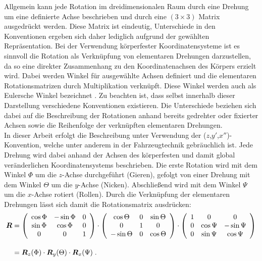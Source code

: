 Allgemein kann jede Rotation im dreidimensionalen Raum durch eine Drehung um eine definierte Achse beschrieben und durch eine $(3 \times 3)$ Matrix ausgedrückt werden. Diese Matrix ist eindeutig, Unterschiede in den Konventionen ergeben sich daher lediglich aufgrund der gewählten Repräsentation. Bei der Verwendung körperfester Koordinatensysteme ist es sinnvoll die Rotation als Verknüpfung von elementaren Drehungen darzustellen, da so eine direkter Zusammenhang zu den Koordinatenachsen des Körpers erzielt wird. Dabei werden Winkel für ausgewählte Achsen definiert und die elementaren Rotationsmatrizen durch Multiplikation verknüpft. Diese Winkel werden auch als Eulersche Winkel bezeichnet \cite{Foley1990}. Zu beachten ist, dass selbst innerhalb dieser Darstellung verschiedene Konventionen existieren. Die Unterschiede beziehen sich dabei auf die Beschreibung der Rotationen anhand bereits gedrehter oder fixierter Achsen sowie die Reihenfolge der verknüpften elementaren Drehungen.\\

In dieser Arbeit erfolgt die Beschreibung unter Verwendung der ($z$,$y'$,$x''$)-Konvention, welche unter anderem in der Fahrzeugtechnik gebräuchlich ist. Jede Drehung wird dabei anhand der Achsen des körperfesten und damit global veränderlichen Koordinatensystems beschrieben. Die erste Rotation wird mit dem Winkel $\Phi$ um die $z$-Achse durchgeführt (Gieren), gefolgt von einer Drehung mit dem Winkel $\Theta$ um die $y$-Achse (Nicken). Abschließend wird mit dem Winkel $\Psi$ um die $x$-Achse rotiert (Rollen). Durch die Verknüpfung der elementaren Drehungen lässt sich damit die Rotationsmatrix ausdrücken:
%
\begin{equation}
\begin{split}
\mbox{\boldmath{$R$}} & = \left( \begin{array}{ccc}  \cos{\Phi} & -\sin{\Phi} & 0 \\ \sin{\Phi} & \cos{\Phi} & 0 \\ 0 & 0 & 1  \end{array} \right) \cdot \left( \begin{array}{ccc}  \cos{\Theta} & 0 & \sin{\Theta} \\ 0 & 1 & 0 \\ -\sin{\Theta} & 0 & \cos{\Theta}  \end{array} \right) \cdot \left( \begin{array}{ccc}  1 & 0 & 0 \\ 0 & \cos{\Psi} & -\sin{\Psi} \\ 0 & \sin{\Psi} & \cos{\Psi}  \end{array} \right) \\[1em]
& = \mbox{\boldmath{$R$}}_z(\Phi) \cdot \mbox{\boldmath{$R$}}_y(\Theta) \cdot \mbox{\boldmath{$R$}}_x(\Psi) \; \text{.}
\end{split}
\end{equation}



